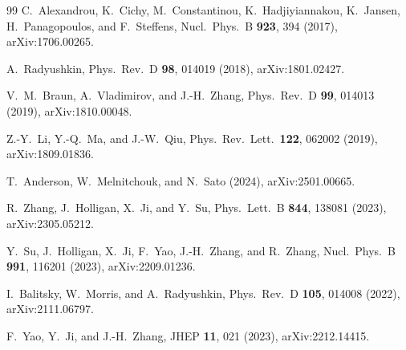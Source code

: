 \documentclass[12pt,a4paper]{ctexart}
\begin{document}
\begin{thebibliography}{99}
 C.~Alexandrou, K.~Cichy, M.~Constantinou, K.~Hadjiyiannakou, K.~Jansen, H.~Panagopoulos, and F.~Steffens, Nucl.\ Phys.\ B \textbf{923}, 394 (2017), arXiv:1706.00265.

 A.~Radyushkin, Phys.\ Rev.\ D \textbf{98}, 014019 (2018), arXiv:1801.02427.

 V.~M.~Braun, A.~Vladimirov, and J.-H.~Zhang, Phys.\ Rev.\ D \textbf{99}, 014013 (2019), arXiv:1810.00048.

 Z.-Y.~Li, Y.-Q.~Ma, and J.-W.~Qiu, Phys.\ Rev.\ Lett.\ \textbf{122}, 062002 (2019), arXiv:1809.01836.

 T.~Anderson, W.~Melnitchouk, and N.~Sato (2024), arXiv:2501.00665.

 R.~Zhang, J.~Holligan, X.~Ji, and Y.~Su, Phys.\ Lett.\ B \textbf{844}, 138081 (2023), arXiv:2305.05212.

 Y.~Su, J.~Holligan, X.~Ji, F.~Yao, J.-H.~Zhang, and R.~Zhang, Nucl.\ Phys.\ B \textbf{991}, 116201 (2023), arXiv:2209.01236.

 I.~Balitsky, W.~Morris, and A.~Radyushkin, Phys.\ Rev.\ D \textbf{105}, 014008 (2022), arXiv:2111.06797.

 F.~Yao, Y.~Ji, and J.-H.~Zhang, JHEP \textbf{11}, 021 (2023), arXiv:2212.14415.

\end{thebibliography}
\end{document}
